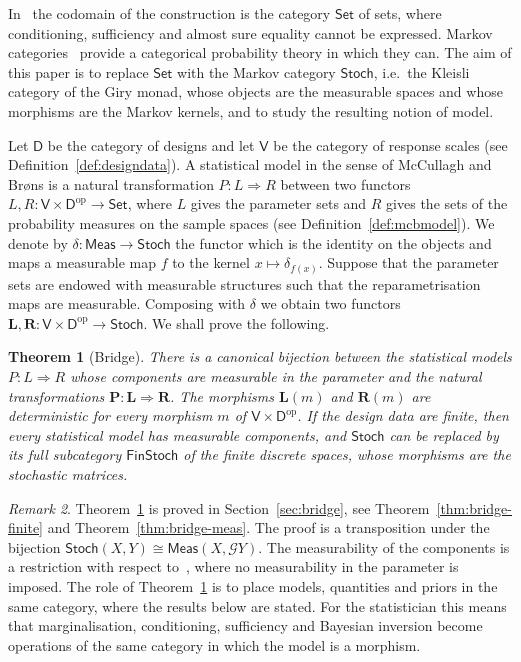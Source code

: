 \documentclass[11pt,a4paper]{article}
\theoremstyle{plain}
\newtheorem{theorem}{Theorem}[section]
\theoremstyle{definition}
\theoremstyle{remark}
\newtheorem{remark}[theorem]{Remark}
\newcommand{\cat}[1]{\mathsf{#1}}
\newcommand{\catV}{\cat{V}}
\newcommand{\catD}{\cat{D}}
\newcommand{\Meas}{\cat{Meas}}
\newcommand{\Set}{\cat{Set}}
\newcommand{\Stoch}{\cat{Stoch}}
\newcommand{\FinStoch}{\cat{FinStoch}}
\newcommand{\G}{\mathcal{G}}
\newcommand{\op}{\mathrm{op}}
\newcommand{\del}{\delta}
\begin{document}
In~\cite{mccullagh_what_2002} the codomain of the construction is the category
$\Set$ of sets, where conditioning, sufficiency and almost sure equality cannot
be expressed. 
Markov
categories~\cite{fritz_synthetic_2020,cho_disintegration_2019,perrone_markov_2024,fritz_definetti_2021}
provide a categorical probability theory in which they can. The aim of this
paper is to replace $\Set$ with the Markov category $\Stoch$, i.e.\ the Kleisli
category of the Giry monad, whose objects are the measurable spaces and whose
morphisms are the Markov kernels, and to study the resulting notion of model.

Let $\catD$ be the category of designs and let $\catV$ be the category of
response scales (see Definition~\ref{def:designdata}). A statistical model in
the sense of McCullagh and Br\o ns is a natural transformation
$P \colon L \Rightarrow R$ between two functors
$L, R \colon \catV \times \catD^{\op} \to \Set$, where $L$ gives the parameter
sets and $R$ gives the sets of the probability measures on the sample spaces
(see Definition~\ref{def:mcbmodel}). We denote by
$\del \colon \Meas \to \Stoch$ the functor which is the identity on the objects
and maps a measurable map $f$ to the kernel $x \mapsto \delta_{f(x)}$. Suppose
that the parameter sets are endowed with measurable structures such that the
reparametrisation maps are measurable. Composing with $\del$ we obtain two
functors $\mathbf{L}, \mathbf{R} \colon \catV \times \catD^{\op} \to \Stoch$.
We shall prove the following.

\begin{theorem}[Bridge]\label{thm:main}
There is a canonical bijection between the statistical models
$P \colon L \Rightarrow R$ whose components are measurable in the parameter
and the natural transformations
$\mathbf{P} \colon \mathbf{L} \Rightarrow \mathbf{R}$. The morphisms
$\mathbf{L}(m)$ and $\mathbf{R}(m)$ are deterministic for every morphism $m$ of
$\catV \times \catD^{\op}$. If the design data are finite, then every
statistical model has measurable components, and $\Stoch$ can be replaced by
its full subcategory $\FinStoch$ of the finite discrete spaces, whose
morphisms are the stochastic matrices.
\end{theorem}

\begin{remark}\label{rem:main}
Theorem~\ref{thm:main} is proved in Section~\ref{sec:bridge}, see
Theorem~\ref{thm:bridge-finite} and Theorem~\ref{thm:bridge-meas}. The proof
is a transposition under the bijection
$\Stoch(X,Y) \cong \Meas(X,\G Y)$. The measurability of the components is a
restriction with respect to~\cite{mccullagh_what_2002}, where no measurability
in the parameter is imposed. The role of Theorem~\ref{thm:main} is to place
models, quantities and priors in the same category, where the results below
are stated. For the statistician this means that marginalisation,
conditioning, sufficiency and Bayesian inversion become operations of the same
category in which the model is a morphism.
\end{remark}
\end{document}
